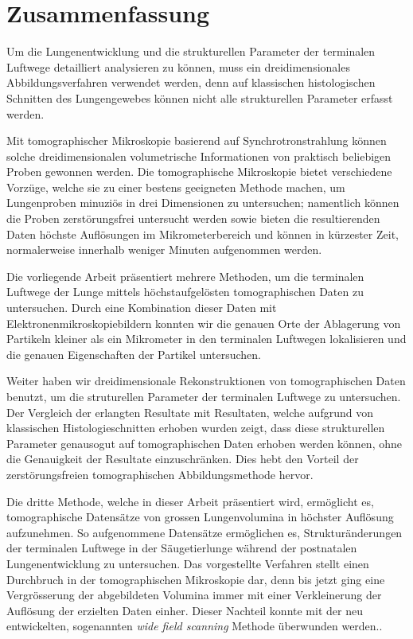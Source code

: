 %
\begingroup%
\let\clearpage\relax%
\let\cleardoublepage\relax%
\let\cleardoublepage\relax%
%
%
\chapter*{Zusammenfassung}
Um die Lungenentwicklung und die strukturellen Parameter der terminalen Luftwege detailliert analysieren zu können, muss ein dreidimensionales Abbildungsverfahren verwendet werden, denn auf klassischen histologischen Schnitten des Lungengewebes können nicht alle strukturellen Parameter erfasst werden.

Mit tomographischer Mikroskopie basierend auf Synchrotronstrahlung können solche dreidimensionalen volumetrische Informationen von praktisch beliebigen Proben gewonnen werden. Die tomographische Mikroskopie bietet verschiedene Vorzüge, welche sie zu einer bestens geeigneten Methode machen, um Lungenproben minuziös in drei Dimensionen zu untersuchen; namentlich können die Proben zerstörungsfrei untersucht werden sowie bieten die resultierenden Daten höchste Auflösungen im Mikrometerbereich und können in kürzester Zeit, normalerweise innerhalb weniger Minuten aufgenommen werden.

Die vorliegende Arbeit präsentiert mehrere Methoden, um die terminalen Luftwege der Lunge mittels höchstaufgelösten tomographischen Daten zu untersuchen. Durch eine Kombination dieser Daten mit Elektronenmikroskopiebildern konnten wir die genauen Orte der Ablagerung von Partikeln kleiner als ein Mikrometer in den terminalen Luftwegen lokalisieren und die genauen Eigenschaften der Partikel untersuchen.

Weiter haben wir dreidimensionale Rekonstruktionen von tomographischen Daten benutzt, um die struturellen Parameter der terminalen Luftwege zu untersuchen. Der Vergleich der erlangten Resultate mit Resultaten, welche aufgrund von klassischen Histologieschnitten erhoben wurden zeigt, dass diese strukturellen Parameter genausogut auf tomographischen Daten erhoben werden können, ohne die Genauigkeit der Resultate einzuschränken. Dies hebt den Vorteil der zerstörungsfreien tomographischen Abbildungsmethode hervor.

Die dritte Methode, welche in dieser Arbeit präsentiert wird, ermöglicht es, tomographische Datensätze von grossen Lungenvolumina in höchster Auflösung aufzunehmen. So aufgenommene Datensätze ermöglichen es, Strukturänderungen der terminalen Luftwege in der Säugetierlunge während der postnatalen Lungenentwicklung zu untersuchen. Das vorgestellte Verfahren stellt einen Durchbruch in der tomographischen Mikroskopie dar, denn bis jetzt ging eine Vergrösserung der abgebildeten Volumina immer mit einer Verkleinerung der Auflösung der erzielten Daten einher. Dieser Nachteil konnte mit der neu entwickelten, sogenannten \emph{wide field scanning} Methode überwunden werden..
%
\endgroup%